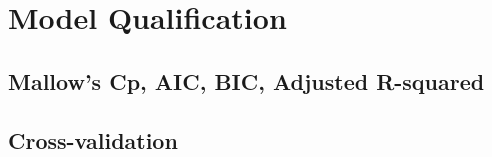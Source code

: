 \section{Model Qualification}

\subsection{Mallow's Cp, AIC, BIC, Adjusted R-squared}

\subsection{Cross-validation}